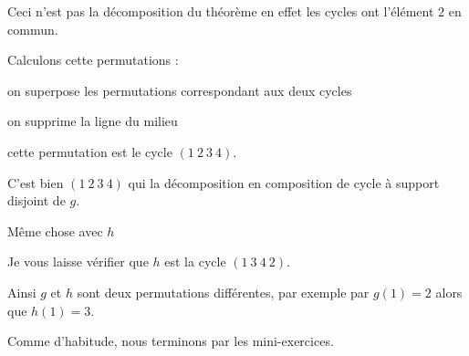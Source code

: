 Ceci n'est pas la décomposition du théorème en effet les cycles ont l'élément $2$ en commun.

Calculons cette permutations :

\change

on superpose les permutations correspondant aux deux cycles 

\change

on supprime la ligne du milieu

\change

cette permutation est le cycle $(1\ 2\ 3\ 4)$.

C'est bien $(1\ 2\ 3\ 4)$ qui la décomposition en composition de cycle à support disjoint de $g$.


\change

Même chose avec $h$

\change

\change

Je vous laisse vérifier que $h$ est la cycle $(1\ 3\ 4\ 2)$.

Ainsi $g$ et $h$ sont deux permutations différentes,
par exemple par $g(1)=2$ alors que $h(1)=3$.




\diapo

Comme d'habitude, nous terminons par les mini-exercices.



